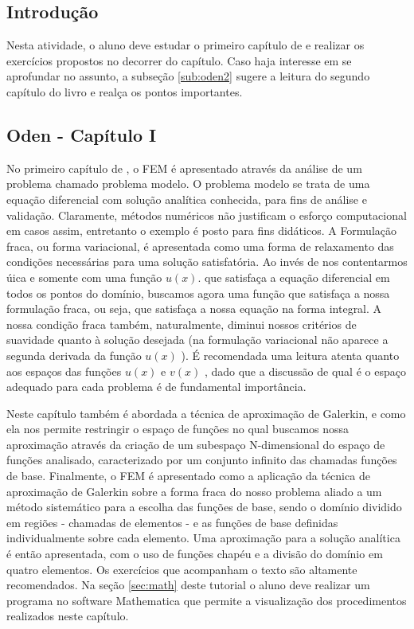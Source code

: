 \documentclass[11pt, oneside]{article}   	%
\begin{document}
\subsection*{Introdução}
Nesta atividade, o aluno deve estudar o primeiro capítulo de \citet{oden81} e realizar os exercícios propostos no decorrer do capítulo. Caso haja interesse em se aprofundar no assunto, a subseção \ref{sub:oden2} sugere a leitura do segundo capítulo do livro e realça os pontos importantes.
\subsection{Oden - Capítulo I}
\label{sub:oden1}
No primeiro capítulo de \citet{oden81}, o FEM é apresentado através da análise de um problema chamado problema modelo. O problema modelo se trata de uma equação diferencial com solução analítica conhecida, para fins de análise e validação. Claramente, métodos numéricos não justificam o esforço computacional em casos assim, entretanto o exemplo é posto para fins didáticos. A Formulação fraca, ou forma variacional, é apresentada como uma forma de relaxamento das condições necessárias para uma solução satisfatória. Ao invés de nos contentarmos úica e somente com uma função $u(x)$.
  que satisfaça a equação diferencial em todos os pontos do domínio, buscamos agora uma função que satisfaça a nossa formulação fraca, ou seja, que satisfaça a nossa equação na forma integral. A nossa condição fraca também, naturalmente, diminui nossos critérios de suavidade quanto à solução desejada (na formulação variacional não aparece a segunda derivada da função $u(x)$
 ). É recomendada uma leitura atenta quanto aos espaços das funções $u(x)$  e $v(x)$ , dado que a discussão de qual é o espaço adequado para cada problema é de fundamental importância. 

Neste capítulo também é abordada a técnica de aproximação de Galerkin, e como ela nos permite restringir o espaço de funções no qual buscamos nossa aproximação através da criação de um subespaço N-dimensional do espaço de funções analisado, caracterizado por um conjunto infinito das chamadas funções de base. Finalmente, o FEM é apresentado como a aplicação da técnica de aproximação de Galerkin sobre a forma fraca do nosso problema aliado a um método sistemático para a escolha das funções de base, sendo o domínio dividido em regiões - chamadas de elementos - e as funções de base definidas individualmente sobre cada elemento. Uma aproximação para a solução analítica é então apresentada, com o uso de funções chapéu e a divisão do domínio em quatro elementos. Os exercícios que acompanham o texto são altamente recomendados. Na seção \ref{sec:math} deste tutorial o aluno deve realizar um programa no software Mathematica que permite a visualização dos procedimentos realizados neste capítulo.
\newpage
\end{document}
